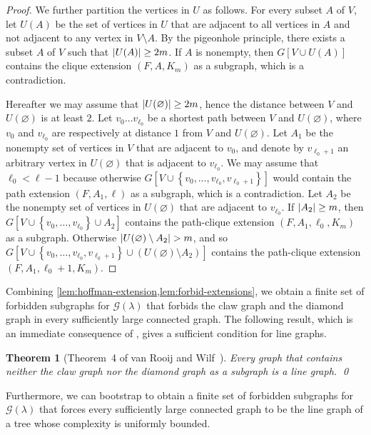\documentclass[11pt]{article}
\newtheorem{theorem}{Theorem}[section]
\theoremstyle{definition}
\theoremstyle{remark}
\DeclarePairedDelimiter\abs{\lvert}{\rvert}
\newcommand{\sset}[1]{\left\{{#1}\right\}}
\newcommand{\la}{\lambda}
\newcommand{\G}{\mathcal{G}}
\newcommand{\Gl}{\G(\la)}
\begin{document}
\begin{proof}
    We further partition the vertices in $U$ as follows. For every subset $A$ of $V$, let $U(A)$ be the set of vertices in $U$ that are adjacent to all vertices in $A$ and not adjacent to any vertex in $V \setminus A$. By the pigeonhole principle, there exists a subset $A$ of $V$ such that $\abs{U(A)} \ge 2m$. If $A$ is nonempty, then $G[V \cup U(A)]$ contains the clique extension $(F, A, K_m)$ as a subgraph, which is a contradiction.
    
    Hereafter we may assume that $\abs{U(\varnothing)} \ge 2m$, hence the distance between $V$ and $U(\varnothing)$ is at least $2$. Let $v_0 \dots v_{\ell_0}$ be a shortest path between $V$ and $U(\varnothing)$, where $v_0$ and $v_{\ell_0}$ are respectively at distance $1$ from $V$ and $U(\varnothing)$. Let $A_1$ be the nonempty set of vertices in $V$ that are adjacent to $v_0$, and denote by $v_{\ell_0 + 1}$ an arbitrary vertex in $U(\varnothing)$ that is adjacent to $v_{\ell_0}$. We may assume that $\ell_0 < \ell - 1$ because otherwise $G[V \cup \sset{v_0, \dots, v_{\ell_0}, v_{\ell_0 + 1}}]$ would contain the path extension $(F, A_1, \ell)$ as a subgraph, which is a contradiction. Let $A_2$ be the nonempty set of vertices in $U(\varnothing)$ that are adjacent to $v_{\ell_0}$. If $\abs{A_2} \ge m$, then $G[V \cup \sset{v_0, \dots, v_{\ell_0}} \cup A_2]$ contains the path-clique extension $(F, A_1, \ell_0, K_m)$ as a subgraph. Otherwise $\abs{U(\varnothing) \setminus A_2} > m$, and so $G[V \cup \sset{v_0, \dots, v_{\ell_0}, v_{\ell_0 + 1}} \cup (U(\varnothing) \setminus A_2)]$ contains the path-clique extension $(F, A_1, \ell_0 + 1, K_m)$.
\end{proof}

Combining \cref{lem:hoffman-extension,lem:forbid-extensions}, we obtain a finite set of forbidden subgraphs for $\Gl$ that forbids the claw graph and the diamond graph in every sufficiently large connected graph. The following result, which is an immediate consequence of \cite[Theorem~4]{RW65}, gives a sufficient condition for line graphs.

\begin{theorem}[Theorem~4 of van Rooij and Wilf~\cite{RW65}] \label{thm:claw-diamond}
    Every graph that contains neither the claw graph nor the diamond graph as a subgraph is a line graph. \qed
\end{theorem}

Furthermore, we can bootstrap to obtain a finite set of forbidden subgraphs for $\Gl$ that forces every sufficiently large connected graph to be the line graph of a tree whose complexity is uniformly bounded.
\end{document}
